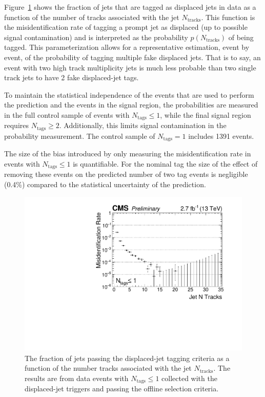 Figure~\ref{fig:fake_rate} shows the fraction of jets that are tagged as displaced 
jets in data as a function of the number of tracks associated with the jet $N_\textrm{tracks}$.  
 This function is the misidentification rate of tagging a prompt jet as displaced (up to possible
 signal contamination)  and is interpreted as the probability  $p(N_\text{tracks})$ of being tagged. This
 parameterization allows for a representative estimation, event by event, of the probability of
 tagging multiple fake displaced jets. That is to say, an event with two high track multiplicity jets is much
 less probable than two single track jets to have 2 fake displaced-jet tags. 

To maintain the statistical independence of the events
that are used to perform the prediction and the events in the signal
region, the probabilities are measured in the full control sample of events
with $N_{\textrm{tags}}\leq 1$, while the final signal region requires
$N_{\textrm{tags}} \geq 2$. Additionally, this limits signal contamination in the probability measurement.
The control sample of $N_{\textrm{tags}}=1$ includes 1391 events. 

The size of the bias introduced by only measuring the misidentification rate in  
events with $N_\textrm{tags}\leq 1$ is quantifiable. For the nominal tag the size
of the effect of removing these events on the predicted number of
two tag events is negligible (0.4\%)
compared to the statistical uncertainty of the prediction.

\begin{figure}
\begin{center}
\includegraphics[width=.6\textwidth]{figures/pas//ANALYSIS/76x_pu/DJET_fakeRate.pdf}
\caption{The fraction of jets passing the displaced-jet tagging criteria as a function of the number tracks associated with the jet $N_{\textrm{tracks}}$. 
The results are from data events with $N_{\textrm{tags}} \leq 1$ collected with the displaced-jet triggers and passing the offline selection criteria. \label{fig:fake_rate}}
\end{center}
\end{figure}

